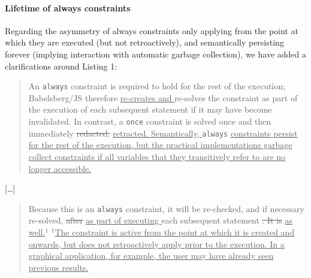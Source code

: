 \documentclass[10pt,twocolumn]{article}
\providecommand{\DIFaddtex}[1]{{\protect\color{BLUE}\uline{#1}}} %
\providecommand{\DIFdeltex}[1]{{\protect\color{gray}\sout{#1}}}                      %
\providecommand{\DIFaddbegin}{} %
\providecommand{\DIFaddend}{} %
\providecommand{\DIFdelbegin}{} %
\providecommand{\DIFdelend}{} %
\providecommand{\DIFadd}[1]{\texorpdfstring{\DIFaddtex{#1}}{#1}} %
\providecommand{\DIFdel}[1]{\texorpdfstring{\DIFdeltex{#1}}{}} %
\begin{document}
\paragraph{Lifetime of always constraints}
\label{sec:lifet-always-constr}
Regarding the asymmetry of always constraints only applying from the
point at which they are executed (but not retroactively), and
semantically persisting forever (implying interaction with automatic
garbage collection), we have added a clarifications around Listing 1:
\begin{quote}
An \verb!always! constraint is required to
hold for the rest of the execution; Babelsberg/JS therefore \DIFaddbegin \DIFadd{re-creates
and }\DIFaddend re-solves the constraint as part of the execution of each
subsequent statement if it may have become invalidated.  In contrast,
a \verb!once! constraint is solved once and then immediately
\DIFdelbegin \DIFdel{redacted. }\DIFdelend \DIFaddbegin \DIFadd{retracted. Semantically, }\verb!always!  \DIFadd{constraints persist for the
rest of the execution, but the practical implementations garbage
collect constraints if all variables that they transitively refer to are no longer
accessible.
}\DIFaddend 
\end{quote}
\begin{center}
[\dots]
\end{center}
\begin{quote}
  Because this is an \verb!always! constraint, it will be re-checked,
  and if necessary re-solved, \DIFdelbegin \DIFdel{after }\DIFdelend
  \DIFaddbegin \DIFadd{as part of executing }\DIFaddend each
  subsequent statement \DIFdelbegin \DIFdel{.  It is }\DIFdelend
  \DIFaddbegin \DIFadd{as well.$^1$}\baselineskip
  {\footnotesize \DIFadd{$^1$The constraint is active from the point
      at which it is created and onwards, but does not retroactively
      apply prior to the execution.  In a graphical application, for
      example, the user may have already seen previous results.}}
  \DIFaddend
\end{quote}
\end{document}
